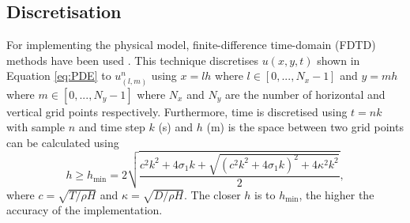 \documentclass{article}
\begin{document}
\subsection{Discretisation}
For implementing the physical model, finite-difference time-domain (FDTD) methods have been used \cite{bilbao2009numerical}. This technique discretises $u(x,y,t)$ shown in Equation \eqref{eq:PDE} to $u_{(l,m)}^n$ using $x=lh$ where $l \in [0, ..., N_x-1]$ and $y=mh$ where $m \in [0, ..., N_y-1]$ where $N_x$ and $N_y$ are the number of horizontal and vertical grid points respectively. Furthermore, time is discretised using $t = nk$ with sample $n$ and time step $k$ (s) and $h$ (m) is the space between two grid points can be calculated using 
\begin{equation}\label{eq:h}
    h \geq h_\text{min} =  2\sqrt{\frac{c^2k^2 + 4\sigma_1k + \sqrt{(c^2k^2 + 4\sigma_1k)^2 + 4\kappa^2 k^2} }{2}},
\end{equation}
where $c = \sqrt{T/\rho H}$ and $\kappa = \sqrt{D/\rho H}$. The closer $h$ is to $h_\text{min}$, the higher the accuracy of the implementation.
\end{document}
